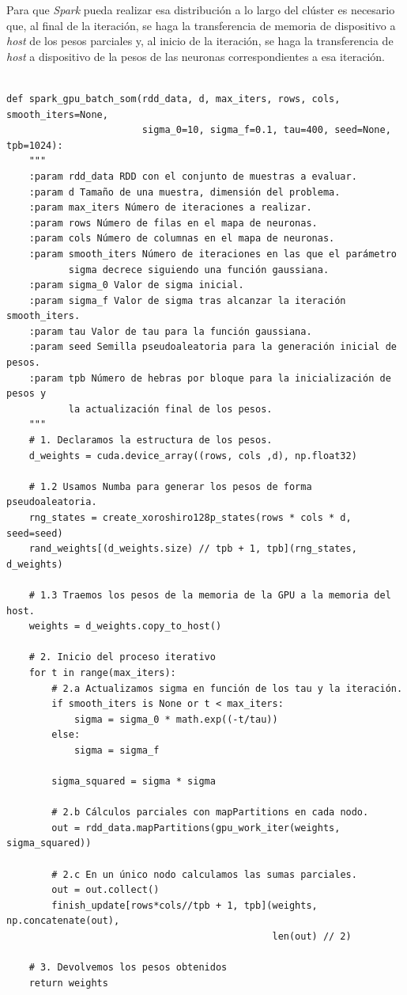 Para que \textit{Spark} pueda realizar esa distribución a lo largo del clúster es necesario que, al final de la iteración, se haga la transferencia de memoria de dispositivo a \textit{host} de los pesos parciales y, al inicio de la iteración, se haga la transferencia de \textit{host} a dispositivo de la pesos de las neuronas correspondientes a esa iteración.

\begin{code}
\begin{verbatim}

def spark_gpu_batch_som(rdd_data, d, max_iters, rows, cols, smooth_iters=None,
                        sigma_0=10, sigma_f=0.1, tau=400, seed=None, tpb=1024):
    """
    :param rdd_data RDD con el conjunto de muestras a evaluar.
    :param d Tamaño de una muestra, dimensión del problema.
    :param max_iters Número de iteraciones a realizar.
    :param rows Número de filas en el mapa de neuronas.
    :param cols Número de columnas en el mapa de neuronas.
    :param smooth_iters Número de iteraciones en las que el parámetro
           sigma decrece siguiendo una función gaussiana. 
    :param sigma_0 Valor de sigma inicial.
    :param sigma_f Valor de sigma tras alcanzar la iteración smooth_iters.
    :param tau Valor de tau para la función gaussiana.
    :param seed Semilla pseudoaleatoria para la generación inicial de pesos.
    :param tpb Número de hebras por bloque para la inicialización de pesos y
           la actualización final de los pesos.
    """
    # 1. Declaramos la estructura de los pesos.
    d_weights = cuda.device_array((rows, cols ,d), np.float32)

    # 1.2 Usamos Numba para generar los pesos de forma pseudoaleatoria.
    rng_states = create_xoroshiro128p_states(rows * cols * d, seed=seed)
    rand_weights[(d_weights.size) // tpb + 1, tpb](rng_states, d_weights)
     
    # 1.3 Traemos los pesos de la memoria de la GPU a la memoria del host.
    weights = d_weights.copy_to_host()

    # 2. Inicio del proceso iterativo
    for t in range(max_iters):
        # 2.a Actualizamos sigma en función de los tau y la iteración.
        if smooth_iters is None or t < max_iters:
            sigma = sigma_0 * math.exp((-t/tau))
        else:
            sigma = sigma_f
            
        sigma_squared = sigma * sigma
        
        # 2.b Cálculos parciales con mapPartitions en cada nodo.
        out = rdd_data.mapPartitions(gpu_work_iter(weights, sigma_squared))
        
        # 2.c En un único nodo calculamos las sumas parciales.
        out = out.collect()
        finish_update[rows*cols//tpb + 1, tpb](weights, np.concatenate(out), 
                                               len(out) // 2)
       
    # 3. Devolvemos los pesos obtenidos
    return weights
\end{verbatim}
\label{code:somspark}
\end{code}

